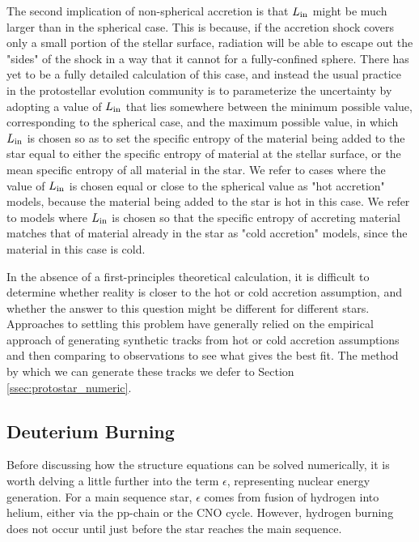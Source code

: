 The second implication of non-spherical accretion is that $L_{\rm in}$ might be much larger than in the spherical case. This is because, if the accretion shock covers only a small portion of the stellar surface, radiation will be able to escape out the "sides" of the shock in a way that it cannot for a fully-confined sphere. There has yet to be a fully detailed calculation of this case, and instead the usual practice in the protostellar evolution community is to parameterize the uncertainty by adopting a value of $L_{\rm in}$ that lies somewhere between the minimum possible value, corresponding to the spherical case, and the maximum possible value, in which $L_{\rm in}$ is chosen so as to set the specific entropy of the material being added to the star equal to either the specific entropy of material at the stellar surface, or the mean specific entropy of all material in the star. We refer to cases where the value of $L_{\rm in}$ is chosen equal or close to the spherical value as "hot accretion" models, because the material being added to the star is hot in this case. We refer to models where $L_{\rm in}$ is chosen so that the specific entropy of accreting material matches that of material already in the star as "cold accretion" models, since the material in this case is cold.

In the absence of a first-principles theoretical calculation, it is difficult to determine whether reality is closer to the hot or cold accretion assumption, and whether the answer to this question might be different for different stars. Approaches to settling this problem have generally relied on the empirical approach of generating synthetic tracks from hot or cold accretion assumptions and then comparing to observations to see what gives the best fit. The method by which we can generate these tracks we defer to Section \ref{ssec:protostar_numeric}.

\subsection{Deuterium Burning}

Before discussing how the structure equations can be solved numerically, it is worth delving a little further into the term $\epsilon$, representing nuclear energy generation. For a main sequence star, $\epsilon$ comes from fusion of hydrogen into helium, either via the pp-chain or the CNO cycle. However, hydrogen burning does not occur until just before the star reaches the main sequence.

